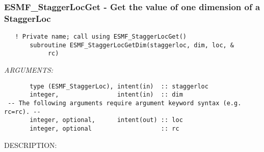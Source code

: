  
\setlength{\oldparskip}{\parskip}
\setlength{\parskip}{1.5ex}
\setlength{\oldparindent}{\parindent}
\setlength{\parindent}{0pt}
\setlength{\oldbaselineskip}{\baselineskip}
\setlength{\baselineskip}{11pt}
 
\def\bv{\begin{verbatim}}
\def\ev{\end{verbatim}}
\def\be{\begin{equation}}
\def\ee{\end{equation}}
\def\bea{\begin{eqnarray}}
\def\eea{\end{eqnarray}}
\def\bi{\begin{itemize}}
\def\ei{\end{itemize}}
\def\bn{\begin{enumerate}}
\def\en{\end{enumerate}}
\def\bd{\begin{description}}
\def\ed{\end{description}}
\def\({\left (}
\def\){\right )}
\def\[{\left [}
\def\]{\right ]}
\def\<{\left  \langle}
\def\>{\right \rangle}
\def\cI{{\cal I}}
\def\diag{\mathop{\rm diag}}
\def\tr{\mathop{\rm tr}}


 
\subsubsection [ESMF\_StaggerLocGet] {ESMF\_StaggerLocGet - Get the value of one dimension of a StaggerLoc}


 
\begin{verbatim}   ! Private name; call using ESMF_StaggerLocGet() 
       subroutine ESMF_StaggerLocGetDim(staggerloc, dim, loc, &
            rc)\end{verbatim}{\em ARGUMENTS:}
\begin{verbatim}       type (ESMF_StaggerLoc), intent(in)  :: staggerloc
       integer,                intent(in)  :: dim
 -- The following arguments require argument keyword syntax (e.g. rc=rc). --
       integer, optional,      intent(out) :: loc
       integer, optional                   :: rc 
 \end{verbatim}
{\sf DESCRIPTION:\\ }


